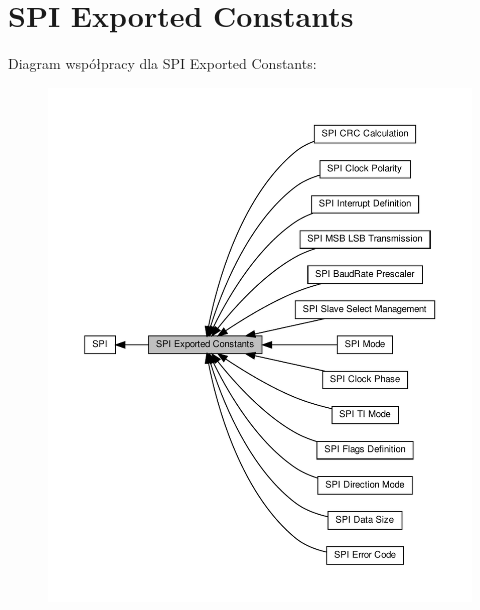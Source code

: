 \hypertarget{group___s_p_i___exported___constants}{}\section{S\+PI Exported Constants}
\label{group___s_p_i___exported___constants}
Diagram współpracy dla S\+PI Exported Constants\+:\nopagebreak
\begin{figure}[H]
\begin{center}
\leavevmode
\includegraphics[width=350pt]{group___s_p_i___exported___constants}
\end{center}
\end{figure}
